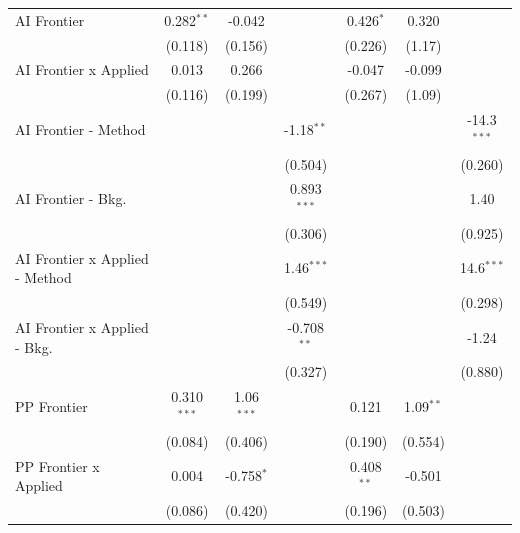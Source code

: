\begin{tabular}{lcccccc}
   AI Frontier                    & 0.282$^{**}$  & -0.042        &               & 0.426$^{*}$   & 0.320        &   \\   
                                  & (0.118)       & (0.156)       &               & (0.226)       & (1.17)       &   \\   
   AI Frontier x Applied          & 0.013         & 0.266         &               & -0.047        & -0.099       &   \\   
                                  & (0.116)       & (0.199)       &               & (0.267)       & (1.09)       &   \\   
   AI Frontier - Method           &               &               & -1.18$^{**}$  &               &              & -14.3$^{***}$\\   
                                  &               &               & (0.504)       &               &              & (0.260)\\   
   AI Frontier - Bkg.             &               &               & 0.893$^{***}$ &               &              & 1.40\\   
                                  &               &               & (0.306)       &               &              & (0.925)\\   
   AI Frontier x Applied - Method &               &               & 1.46$^{***}$  &               &              & 14.6$^{***}$\\   
                                  &               &               & (0.549)       &               &              & (0.298)\\   
   AI Frontier x Applied - Bkg.   &               &               & -0.708$^{**}$ &               &              & -1.24\\   
                                  &               &               & (0.327)       &               &              & (0.880)\\   
   PP Frontier                    & 0.310$^{***}$ & 1.06$^{***}$  &               & 0.121         & 1.09$^{**}$  &   \\   
                                  & (0.084)       & (0.406)       &               & (0.190)       & (0.554)      &   \\   
   PP Frontier x Applied          & 0.004         & -0.758$^{*}$  &               & 0.408$^{**}$  & -0.501       &   \\   
                                  & (0.086)       & (0.420)       &               & (0.196)       & (0.503)      &   \\   

\end{tabular}
